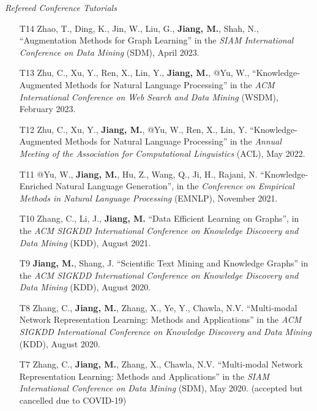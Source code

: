 \documentclass[10pt]{article}
\newenvironment{myindentpar}[1]%
{\begin{list}{}%
         {\setlength{\leftmargin}{#1}}%
         \item[]%
}
{\end{list}}
\newcounter{list}
\begin{document}
\begin{myindentpar}{0.00cm}
\begin{enumerate}[leftmargin=.5cm]
\end{enumerate}

\hspace{-0.25cm}\textit{Refereed Conference Tutorials}

\begin{enumerate}[leftmargin=.5cm]

\item[T14] Zhao, T., Ding, K., Jin, W., Liu, G., \textbf{Jiang, M.}, Shah, N., ``Augmentation Methods for Graph Learning'' in the \textit{SIAM International Conference on Data Mining} (SDM), April 2023.
		
\item[T13] Zhu, C., Xu, Y., Ren, X., Lin, Y., \textbf{Jiang, M.}, @Yu, W., ``Knowledge-Augmented Methods for Natural Language Processing'' in the \textit{ACM International Conference on Web Search and Data Mining} (WSDM), February 2023.

\item[T12] Zhu, C., Xu, Y., \textbf{Jiang, M.}, @Yu, W., Ren, X., Lin, Y. ``Knowledge-Augmented Methods for Natural Language Processing'' in the \textit{Annual Meeting of the Association for Computational Linguistics} (ACL), May 2022.

\item[T11] @Yu, W., \textbf{Jiang, M.}, Hu, Z., Wang, Q., Ji, H., Rajani, N. ``Knowledge-Enriched Natural Language Generation'', in the \textit{Conference on Empirical Methods in Natural Language Processing} (EMNLP), November 2021.

\item[T10] Zhang, C., Li, J., \textbf{Jiang, M.} ``Data Efficient Learning on Graphs'', in the \textit{ACM SIGKDD International Conference on Knowledge Discovery and Data Mining} (KDD), August 2021.
		
\item[T9] \textbf{Jiang, M.}, Shang, J. ``Scientific Text Mining and Knowledge Graphs'' in the \textit{ACM SIGKDD International Conference on Knowledge Discovery and Data Mining} (KDD), August 2020.
		
\item[T8] Zhang, C., \textbf{Jiang, M.}, Zhang, X., Ye, Y., Chawla, N.V. ``Multi-modal Network Representation Learning: Methods and Applications'' in the \textit{ACM SIGKDD International Conference on Knowledge Discovery and Data Mining} (KDD), August 2020.

\item[T7] Zhang, C., \textbf{Jiang, M.}, Zhang, X., Chawla, N.V. ``Multi-modal Network Representation Learning: Methods and Applications'' in the \textit{SIAM International Conference on Data Mining} (SDM), May 2020. (accepted but cancelled due to COVID-19)


\end{enumerate}
\end{myindentpar}
\end{document}
